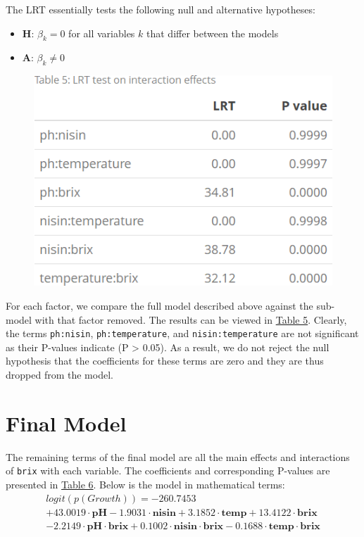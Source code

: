 \documentclass[
  12pt,
]{article}
\providecommand{\tightlist}{%
  \setlength{\itemsep}{0pt}\setlength{\parskip}{0pt}}
\begin{document}
The LRT essentially tests the following null and alternative hypotheses:

\begin{itemize}
\tightlist
\item
  \textbf{H}: \(\beta_k = 0\) for all variables \(k\) that differ
  between the models
\item
  \textbf{A}: \(\beta_k \neq 0\)
\end{itemize}

\begin{figure}
\centering
\includegraphics{table5}
\caption*{}
\label{table5}
\end{figure}

For each factor, we compare the full model described above against the
sub-model with that factor removed. The results can be viewed in
\hyperref[table5]{Table 5}. Clearly, the terms \texttt{ph:nisin},
\texttt{ph:temperature}, and \texttt{nisin:temperature} are not
significant as their P-values indicate (P \textgreater{} 0.05). As a
result, we do not reject the null hypothesis that the coefficients for
these terms are zero and they are thus dropped from the model.

\hypertarget{final-model}{%
\section{Final Model}\label{final-model}}

The remaining terms of the final model are all the main effects and
interactions of \texttt{brix} with each variable. The coefficients and
corresponding P-values are presented in \hyperref[table6]{Table 6}.
Below is the model in mathematical terms: \begin{multline}
logit(p(Growth)) = -260.7453 \\
+ 43.0019\cdot\pmb{pH} - 1.9031\cdot\pmb{nisin} + 3.1852\cdot\pmb{temp} + 13.4122\cdot\pmb{brix} \\
- 2.2149\cdot\pmb{pH}\cdot\pmb{brix} + 0.1002\cdot\pmb{nisin}\cdot\pmb{brix} - 0.1688\cdot\pmb{temp}\cdot\pmb{brix}
\end{multline}
\end{document}
